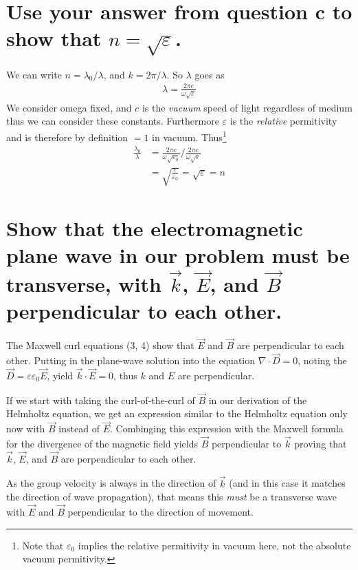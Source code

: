 \documentclass[12pt,a4paper,twosided]{article}
\begin{document}
\section{Use your answer from question c to show that $n = \sqrt{\varepsilon}$.}
We can write $n = \lambda_0/\lambda$, and $k = 2 \pi / \lambda$. So $\lambda$ goes as
\begin{align}
  \lambda = \frac{2 \pi c}{\omega \sqrt{\varepsilon}}
\end{align}
We consider omega fixed, and $c$ is the {\em vacuum} speed of light regardless of medium thus we can consider these constants. Furthermore $\varepsilon$ is the {\em relative} permitivity and is therefore by definition $=1$ in vacuum. Thus\footnote{Note that $\varepsilon_0$ implies the relative permitivity in vacuum here, not the absolute vacuum permitivity.}
\begin{align}
\frac{\lambda_0}{\lambda} &= \frac{2 \pi c}{\omega \sqrt{\varepsilon_0}} / \frac{2 \pi c}{\omega \sqrt{\varepsilon}}\\
&= \sqrt{\frac{\varepsilon}{\varepsilon_0}} = \sqrt{\varepsilon} = n
\end{align}
\section{Show that the electromagnetic plane wave in our problem must be transverse, with $\vec k$, $\vec E$, and $\vec B$ perpendicular
to each other.}
The Maxwell curl equations (3, 4) show that $\vec E$ and $\vec B$ are perpendicular to each other.
Putting in the plane-wave solution into the equation $\nabla \cdot \vec D = 0$, noting the $\vec D = \varepsilon \varepsilon_0 \vec E$, yield $\vec k \cdot \vec E = 0$, thus $k$ and $E$ are perpendicular.
\par If we start with taking the curl-of-the-curl of $\vec B$ in our derivation of the Helmholtz equation, we get an expression similar to the Helmholtz equation only now with $\vec B$ instead of $\vec E$. Combinging this expression with the Maxwell formula for the divergence of the magnetic field yields $\vec B$ perpendicular to $\vec k$ proving that  $\vec k$, $\vec E$, and $\vec B$ are perpendicular to each other.
\par As the group velocity is always in the direction of $\vec k$ (and in this case it matches the direction of wave propagation), that means this {\em must} be a transverse wave with $\vec E$ and $\vec B$ perpendicular to the direction of movement.
\end{document}
